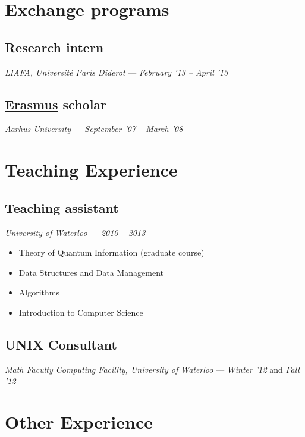 \documentclass[]{article}
\begin{document}
\section{Exchange programs}\label{exchange-programs}

\subsection{Research intern}\label{research-intern}

\emph{LIAFA, Université Paris Diderot} --- \emph{February '13 -- April
'13}

\subsection{\href{http://en.wikipedia.org/wiki/Erasmus_Programme}{Erasmus}
scholar}\label{erasmus-scholar}

\emph{Aarhus University} --- \emph{September '07 -- March '08}

\section{Teaching Experience}\label{teaching-experience}

\subsection{Teaching assistant}\label{teaching-assistant}

\emph{University of Waterloo} --- \emph{2010 -- 2013}

\begin{itemize}
\item Theory of Quantum Information (graduate course)
\item Data Structures and Data Management
\item Algorithms
\item Introduction to Computer Science
\end{itemize}

\subsection{UNIX Consultant}
\emph{Math Faculty Computing Facility, University of Waterloo} ---
\emph{Winter '12} and \emph{Fall '12}


\section{Other Experience}\label{work-experience}
\end{document}
